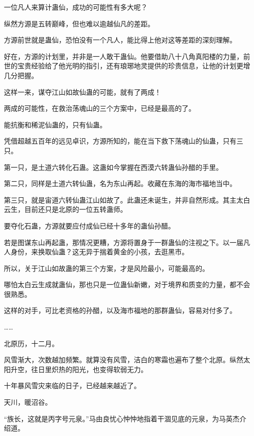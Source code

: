 
\begin{this_body}



一位凡人来算计蛊仙，成功的可能性有多大呢？

纵然方源是五转巅峰，但也难以逾越仙凡的差距。

方源前世就是蛊仙，恐怕没有一个凡人，能比得上他对这等差距的深刻理解。

好在，方源的计划里，并非是一人敢干蛊仙。他要借助八十八角真阳楼的力量，前世的宝贵经验给了他光明的指引，还有琅琊地灵提供的珍贵信息，让他的计划更增几分把握。

这样一来，谋夺江山如故仙蛊的可能，就有了两成！

两成的可能性，在救治荡魂山的三个方案中，已经是最高的了。

能抗衡和稀泥仙蛊的，只有仙蛊。

凭借超越五百年的远见卓识，方源所知的，能在当下救下荡魂山的仙蛊，只有三只。

第一只，是土道六转化石蛊。这蛊如今掌握在西漠六转蛊仙孙醋的手里。

第二只，同样是土道六转仙蛊，名为东山再起。收藏在东海的海市福地当中。

第三只，就是宙道六转仙蛊江山如故了。此蛊还未诞生，并非自然形成。其主太白云生，目前还只是北原的一位五转蛊师。

要夺化石蛊，方源就要应付成仙已经十多年的蛊仙孙醋。

若是图谋东山再起蛊，那情况更糟，方源将置身于一群蛊仙的注视之下。以一届凡人身份，来换取仙蛊？这无异于揣着黄金的小孩，去逛黑市。

所以，关于江山如故蛊的第三个方案，才是风险最小，可能最高的。

哪怕太白云生成就蛊仙，那也只是一位蛊仙新嫩，对于境界和质变的力量，都不会很熟悉。

这样的对手，可比老资格的孙醋，以及海市福地的那群蛊仙，容易对付多了。

……

北原历，十二月。

风雪渐大，次数越加频繁。就算没有风雪，洁白的寒霜也遍布了整个北原。纵然太阳升空，往日里炽热的阳光，也变得软弱无力。

十年暴风雪灾来临的日子，已经越来越近了。

天川，暖沼谷。

“族长，这就是丙字号元泉。”马由良忧心忡忡地指着干涸见底的元泉，为马英杰介绍道。


\end{this_body}
